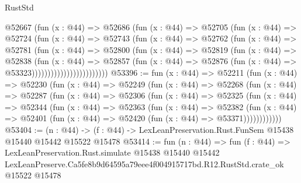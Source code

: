 \begin{lexlean}{RustStd}
\begin{coremodule}
                          @52667
                            (fun (x : @44) =>
                            @52686
                              (fun (x : @44) =>
                              @52705
                                (fun (x : @44) =>
                                @52724
                                  (fun (x : @44) =>
                                  @52743
                                    (fun (x : @44) =>
                                    @52762
                                      (fun (x : @44) =>
                                      @52781
                                        (fun (x : @44) =>
                                        @52800
                                          (fun (x : @44) =>
                                          @52819
                                            (fun (x : @44) =>
                                            @52838
                                              (fun (x : @44) =>
                                              @52857
                                                (fun (x : @44) =>
                                                @52876
                                                  (fun (x : @44) => @53323))))))))))))))))))))))))
@53396 := fun (x : @44) =>
  @52211
    (fun (x : @44) =>
    @52230
      (fun (x : @44) =>
      @52249
        (fun (x : @44) =>
        @52268
          (fun (x : @44) =>
          @52287
            (fun (x : @44) =>
            @52306
              (fun (x : @44) =>
              @52325
                (fun (x : @44) =>
                @52344
                  (fun (x : @44) =>
                  @52363
                    (fun (x : @44) =>
                    @52382
                      (fun (x : @44) =>
                      @52401 (fun (x : @44) => @52420 (fun (x : @44) => @53371))))))))))))
@53404 := (n : @44) ->
  (f : @44) -> LexLeanPreservation.Rust.FunSem @15438 @15440 @15442 @15522 @15478
@53414 := fun (n : @44) =>
  fun (f : @44) =>
  LexLeanPreservation.Rust.simulate
    @15438
    @15440
    @15442
    LexLeanPreserve.Ca5fe8b9d64595a79eee4f004915717bd.R12.RustStd.crate_ok
    @15522
    @15478
\end{coremodule}
\end{lexlean}

